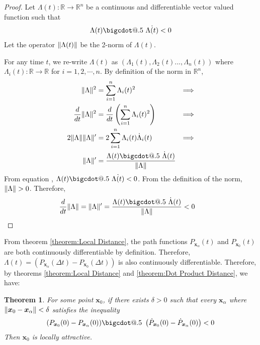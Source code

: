 \documentclass{article}
\makeatletter
\newcommand{\B}[1]{\boldsymbol{#1}}
\newcommand*\bigcdot{\mathpalette\bigcdot@{.5}}
\newcommand*\bigcdot@[2]{\mathbin{\vcenter{\hbox{\scalebox{#2}{$\m@th#1\bullet$}}}}}
\DeclarePairedDelimiter\norm{\lVert}{\rVert}%
\newtheorem{theorem}{Theorem}[section]
\theoremstyle{definition}
\theoremstyle{remark}
\makeatother
\begin{document}
\begin{proof}
  Let $\Lambda(t): \mathbb{R} \to \mathbb{R}^n$ be a continuous and differentiable vector valued
  function such that
  \begin{align}
    \Lambda(t) \bigcdot~ \dot{\Lambda(t)} < 0 \label{eq:Lambda Dot}
  \end{align}
  Let the operator $\norm{\Lambda(t)}$ be the 2-norm of $\Lambda(t)$.

  For any time $t$, we re-write $\Lambda(t)$ as $\left( \Lambda_1(t), \Lambda_2(t)..., \Lambda_n(t) \right)$
  where $\Lambda_i(t) : \mathbb{R} \to \mathbb{R}$ for $i = 1, 2, \cdots, n$. By definition of the norm in $\mathbb{R}^n$,
  \begin{align}
    \norm{\Lambda}^2 &= \sum_{i=1}^n \Lambda_i(t)^2 & \Longrightarrow \nonumber\\
    \frac{d}{dt} \norm{\Lambda}^2 &= \frac{d}{dt} \left(\sum_{i=1}^n \Lambda_i(t)^2\right)  & \Longrightarrow \nonumber\\
    2\norm{\Lambda} \norm{\Lambda}^\prime &= 2\sum_{i=1}^n \Lambda_i(t)\dot{\Lambda}_i(t)  & \Longrightarrow \nonumber\\
    \norm{\Lambda}^\prime &= \frac{\Lambda(t)  \bigcdot~ \dot{\Lambda}(t)}{\norm{\Lambda}} 
  \end{align}
  From equation , $\Lambda(t) \bigcdot~ \dot{\Lambda(t)} < 0$. From the definition of the norm,
  $\norm{\Lambda} > 0$. Therefore, 
  \begin{align}
    \frac{d}{dt} \norm{\Lambda} &= \norm{\Lambda}^\prime = \frac{\Lambda(t)  \bigcdot~ \dot{\Lambda}(t)}{\norm{\Lambda}} < 0 \label{Distance Derivative}
  \end{align}
\end{proof}

From theorem \ref{theorem:Local Distance}, the path functions $P_{\B{x}_\alpha}(t)$ and $P_{\B{x}_0}(t)$ are both
continuously differentiable by definition. Therefore, $\Lambda(t) = (P_{\B{x}_\alpha}(\Delta t) - P_{\B{x}_0}(\Delta t))$ is 
also continuously differentiable.
Therefore, by theorems \ref{theorem:Local Distance} and \ref{theorem:Dot Product Distance}, we have:

\begin{theorem}
  \label{Local Dot Product}
  For some point $\B{x}_0$, if there exists $\delta > 0$ such that every
  $\B{x}_\alpha$ where $\norm{\B{x}_0 - \B{x}_\alpha} < \delta$ satisfies the inequality
  \begin{align}
    ({P}_{\B{x}_0}(0) - {P}_{\B{x}_\alpha}(0)) \bigcdot~ \left(\dot{P}_{\B{x}_0}(0) - \dot{P}_{\B{x}_\alpha}(0)\right) < 0 \label{eq:Dot Inequality}
  \end{align}
  Then $\B{x}_0$ is locally attractive.
\end{theorem}
\end{document}
